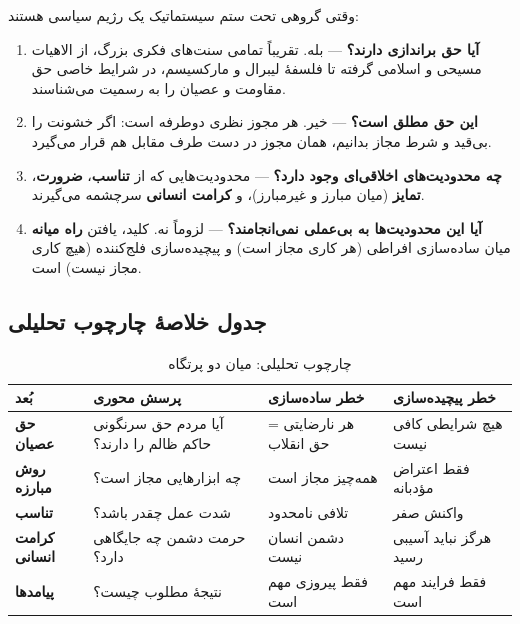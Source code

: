 \documentclass[12pt,a4paper]{article}
\newcommand{\concept}[1]{\textbf{\color{PrimaryMid}#1}}
\begin{document}
\begin{tcolorbox}[defbox, title={\textbf{پرسش بنیادین}}]
وقتی گروهی تحت ستم سیستماتیک یک رژیم سیاسی هستند:
\begin{enumerate}[label=\textbf{\arabic*.}]
\item \textbf{آیا حق براندازی دارند؟} — بله. تقریباً تمامی سنت‌های فکری بزرگ، 
از الاهیات مسیحی و اسلامی گرفته تا فلسفهٔ لیبرال و مارکسیسم، در شرایط خاصی 
حق مقاومت و عصیان را به رسمیت می‌شناسند.
\item \textbf{این حق مطلق است؟} — خیر. هر مجوز نظری دوطرفه است: اگر خشونت 
را بی‌قید و شرط مجاز بدانیم، همان مجوز در دست طرف مقابل هم قرار می‌گیرد.
\item \textbf{چه محدودیت‌های اخلاقی‌ای وجود دارد؟} — محدودیت‌هایی که از 
\concept{تناسب}، \concept{ضرورت}، \concept{تمایز} (میان مبارز و غیرمبارز)، 
و \concept{کرامت انسانی} سرچشمه می‌گیرند.
\item \textbf{آیا این محدودیت‌ها به بی‌عملی نمی‌انجامند؟} — لزوماً نه. کلید، 
یافتن \concept{راه میانه} میان ساده‌سازی افراطی (هر کاری مجاز است) و 
پیچیده‌سازی فلج‌کننده (هیچ کاری مجاز نیست) است.
\end{enumerate}
\end{tcolorbox}

\subsection*{جدول خلاصهٔ چارچوب تحلیلی}

\begin{table}[htbp]
\centering
\small
\begin{tabularx}{\linewidth}{|>{\bfseries\raggedleft}p{2.5cm}|X|X|X|}
\hline
\rowcolor{BgCool}
\textbf{بُعد} & \textbf{پرسش محوری} & \textbf{خطر ساده‌سازی} & \textbf{خطر پیچیده‌سازی} \\
\hline
حق عصیان & آیا مردم حق سرنگونی حاکم ظالم را دارند؟ & هر نارضایتی = حق انقلاب & هیچ شرایطی کافی نیست \\
\hline
روش مبارزه & چه ابزارهایی مجاز است؟ & همه‌چیز مجاز است & فقط اعتراض مؤدبانه \\
\hline
تناسب & شدت عمل چقدر باشد؟ & تلافی نامحدود & واکنش صفر \\
\hline
کرامت انسانی & حرمت دشمن چه جایگاهی دارد؟ & دشمن انسان نیست & هرگز نباید آسیبی رسید \\
\hline
پیامدها & نتیجهٔ مطلوب چیست؟ & فقط پیروزی مهم است & فقط فرایند مهم است \\
\hline
\end{tabularx}
\caption*{چارچوب تحلیلی: میان دو پرتگاه}
\end{table}
\end{document}
